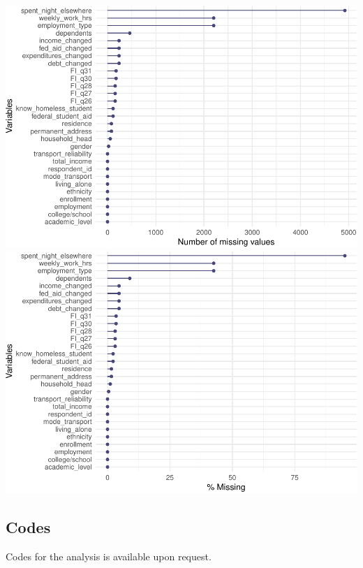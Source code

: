 \documentclass[
  10pt,
]{article}
\begin{document}
\includegraphics{phase2_report_files/figure-latex/unnamed-chunk-14-2}
\includegraphics{phase2_report_files/figure-latex/unnamed-chunk-14-3}

\hypertarget{codes}{%
\subsection{Codes}\label{codes}}

Codes for the analysis is available upon request.
\end{document}
